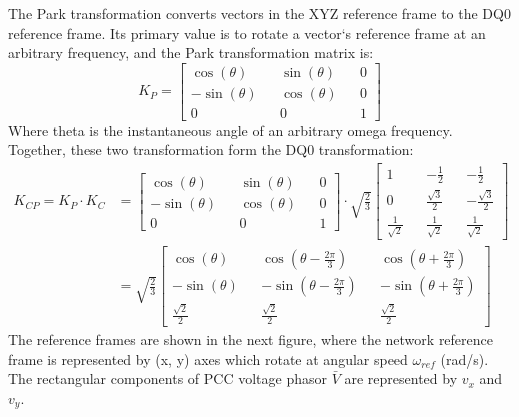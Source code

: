 \documentclass{report}
\begin{document}
The Park transformation converts vectors in the XYZ reference frame to the DQ0 reference frame. Its primary value is to rotate a vector`s reference frame at an arbitrary frequency, and the Park transformation matrix is:
\begin{equation}
    K_P =  
        \begin{bmatrix}
            \cos(\theta) && \sin(\theta) && 0 \\
            -\sin(\theta) && \cos(\theta) && 0 \\
            0 && 0 && 1
        \end{bmatrix}
\end{equation}
Where theta is the instantaneous angle of an arbitrary omega frequency. Together, these two transformation form the DQ0 transformation:
\begin{equation}
\begin{aligned}
    K_{CP} = K_P\cdot K_C &=
    \begin{bmatrix}
            \cos(\theta) && \sin(\theta) && 0 \\
            -\sin(\theta) && \cos(\theta) && 0 \\
            0 && 0 && 1
        \end{bmatrix}
    \cdot
    \sqrt{\frac{2}{3}}
    \begin{bmatrix}
            1 && -\frac{1}{2} && -\frac{1}{2} \\
            0 && \frac{\sqrt{3}}{2} && -\frac{\sqrt{3}}{2} \\
            \frac{1}{\sqrt{2}} && \frac{1}{\sqrt{2}} && \frac{1}{\sqrt{2}}
        \end{bmatrix}
    \\ &=
    \sqrt{\frac{2}{3}}
    \begin{bmatrix}
        \cos(\theta) && \cos(\theta - \frac{2\pi}{3}) && \cos(\theta + \frac{2\pi}{3}) \\
        -\sin(\theta) && -\sin(\theta - \frac{2\pi}{3}) && -\sin(\theta + \frac{2\pi}{3}) \\
        \frac{\sqrt{2}}{2} && \frac{\sqrt{2}}{2} && \frac{\sqrt{2}}{2}
    \end{bmatrix}
\end{aligned}
\label{dq0_equation}
\end{equation}
The reference frames are shown in the next figure, where the network reference frame is represented by (x, y) axes which rotate at angular speed $\omega_{ref}$ (rad/s). The rectangular components of PCC voltage phasor $\bar{V}$ are represented by $v_x$ and $v_y$.
\end{document}
